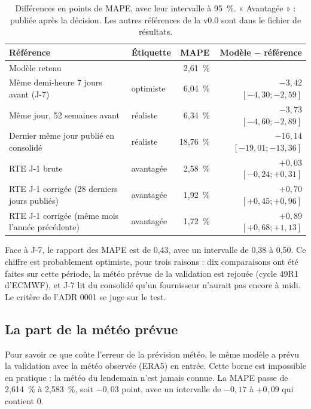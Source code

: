 \documentclass[11pt,a4paper]{article}
\begin{document}
\begin{table}[H]
\small
\begin{tabularx}{\linewidth}{Ylrr}
\toprule
\textbf{Référence} & \textbf{Étiquette} & \textbf{MAPE} & \textbf{Modèle $-$ référence} \\
\midrule
Modèle retenu & & 2,61~\% & \\
Même demi-heure 7 jours avant (J-7) & optimiste & 6,04~\% & $-3{,}42$ $[-4{,}30 ; -2{,}59]$ \\
Même jour, 52 semaines avant & réaliste & 6,34~\% & $-3{,}73$ $[-4{,}60 ; -2{,}89]$ \\
Dernier même jour publié en consolidé & réaliste & 18,76~\% & $-16{,}14$ $[-19{,}01 ; -13{,}36]$ \\
RTE J-1 brute & avantagée & 2,58~\% & $+0{,}03$ $[-0{,}24 ; +0{,}31]$ \\
RTE J-1 corrigée (28 derniers jours publiés) & avantagée & 1,92~\% & $+0{,}70$ $[+0{,}45 ; +0{,}96]$ \\
RTE J-1 corrigée (même mois l'année précédente) & avantagée & 1,72~\% & $+0{,}89$ $[+0{,}68 ; +1{,}13]$ \\
\bottomrule
\end{tabularx}
\caption{Différences en points de MAPE, avec leur intervalle à 95~\%. « Avantagée » : publiée après la décision. Les autres références de la v0.0 sont dans le fichier de résultats.}
\end{table}

Face à J-7, le rapport des MAPE est de 0,43, avec un intervalle de 0,38 à 0,50. Ce chiffre est probablement optimiste, pour trois raisons : dix comparaisons ont été faites sur cette période, la météo prévue de la validation est rejouée (cycle 49R1 d'ECMWF), et J-7 lit du consolidé qu'un fournisseur n'aurait pas encore à midi. Le critère de l'ADR 0001 se juge sur le test.

\subsection{La part de la météo prévue}

Pour savoir ce que coûte l'erreur de la prévision météo, le même modèle a prévu la validation avec la météo observée (ERA5) en entrée. Cette borne est impossible en pratique : la météo du lendemain n'est jamais connue. La MAPE passe de 2,614~\% à 2,583~\%, soit $-0{,}03$ point, avec un intervalle de $-0{,}17$ à $+0{,}09$ qui contient 0.

\end{document}
